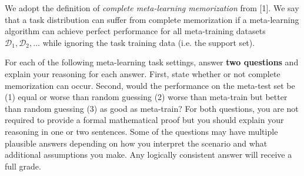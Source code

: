\documentclass[12pt]{article}
\begin{document}
We adopt the definition of \textit{complete meta-learning memorization} from [1].
We say that a task distribution can suffer from complete memorization if a meta-learning algorithm can achieve perfect performance for all meta-training datasets $\mathcal{D}_1, \mathcal{D}_2, \ldots$ while ignoring the task training data (i.e. the support set).

For each of the following meta-learning task settings, answer \textbf{two questions} and explain your reasoning for each answer. 
First, state whether or not complete memorization can occur.
Second, would the performance on the meta-test set be (1) equal or worse than random guessing (2) worse than meta-train but better than random guessing (3) as good as meta-train?
For both questions, you are not required to provide a formal mathematical proof but you should explain your reasoning in one or two sentences.
Some of the questions may have multiple plausible answers depending on how you interpret the scenario and what additional assumptions you make. 
Any logically consistent answer will receive a full grade.
\end{document}
